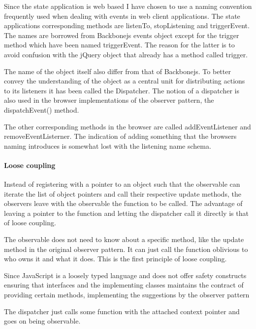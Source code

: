\documentclass[english]{ifimaster}
\begin{document}
Since the state application is web based I have chosen to use a naming convention frequently used when dealing with events in web client applications. The state applications corresponding methods are listenTo, stopListening and triggerEvent. The names are borrowed from Backbonejs events object except for the trigger method which have been named triggerEvent. The reason for the latter is to avoid confusion with the jQuery object that already has a method called trigger.

The name of the object itself also differ from that of Backbonejs. To better convey the understanding of the object as a central unit for distributing actions to its listeners it has been called the Dispatcher. The notion of a dispatcher is also used in the browser implementations of the observer pattern, the dispatchEvent() method. 

The other corresponding methods in the browser are called addEventListener and removeEventListerner. The indication of adding something that the browsers naming introduces is somewhat lost with the listening name schema. 

\paragraph{Loose coupling} Instead of registering with a pointer to an object such that the observable can iterate the list of object pointers and call their respective update methods, the observers leave with the observable the function to be called. The advantage of leaving a pointer to the function and letting the dispatcher call it directly is that of loose coupling.

The observable does not need to know about a specific method, like the update method in the original observer pattern. It can just call the function oblivious to who owns it and what it does. This is the first principle of loose coupling.

Since JavaScript is a loosely typed language and does not offer safety constructs ensuring that interfaces and the implementing classes maintains the contract of providing certain methods, implementing the suggestions by the observer pattern  

The dispatcher just calls some function with the attached context pointer and goes on being observable. 
\end{document}
